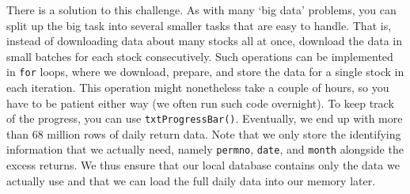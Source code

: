 \documentclass[
]{book}
\begin{document}
There is a solution to this challenge. As with many `big data' problems, you can split up the big task into several smaller tasks that are easy to handle. That is, instead of downloading data about many stocks all at once, download the data in small batches for each stock consecutively. Such operations can be implemented in \texttt{for} loops, where we download, prepare, and store the data for a single stock in each iteration. This operation might nonetheless take a couple of hours, so you have to be patient either way (we often run such code overnight). To keep track of the progress, you can use \texttt{txtProgressBar()}. Eventually, we end up with more than 68 million rows of daily return data. Note that we only store the identifying information that we actually need, namely \texttt{permno}, \texttt{date}, and \texttt{month} alongside the excess returns. We thus ensure that our local database contains only the data we actually use and that we can load the full daily data into our memory later.
\end{document}
